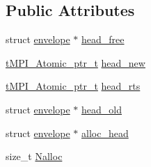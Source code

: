 \subsection*{\-Public \-Attributes}
\begin{DoxyCompactItemize}
\item 
struct \hyperlink{structenvelope}{envelope} $\ast$ \hyperlink{structsend__envelope__list_a0e2ab025b8d30d676b6a968bf12377fc}{head\-\_\-free}
\item 
\hyperlink{include_2thread__mpi_2atomic_2gcc_8h_a4c91c0105f1c0a5f23bc4239274291eb}{t\-M\-P\-I\-\_\-\-Atomic\-\_\-ptr\-\_\-t} \hyperlink{structsend__envelope__list_a636fe4aa11bf8961cd3c3e834186c24c}{head\-\_\-new}
\item 
\hyperlink{include_2thread__mpi_2atomic_2gcc_8h_a4c91c0105f1c0a5f23bc4239274291eb}{t\-M\-P\-I\-\_\-\-Atomic\-\_\-ptr\-\_\-t} \hyperlink{structsend__envelope__list_acf27274dc94ca36d5d8df6f9a2168ed2}{head\-\_\-rts}
\item 
struct \hyperlink{structenvelope}{envelope} $\ast$ \hyperlink{structsend__envelope__list_af74f4cd828255f28b769d1ecfd93bf58}{head\-\_\-old}
\item 
struct \hyperlink{structenvelope}{envelope} $\ast$ \hyperlink{structsend__envelope__list_a30d44c3a034817520d02894ff77c2092}{alloc\-\_\-head}
\item 
size\-\_\-t \hyperlink{structsend__envelope__list_aa51c596956a6dee67805624197c00743}{\-Nalloc}
\end{DoxyCompactItemize}


